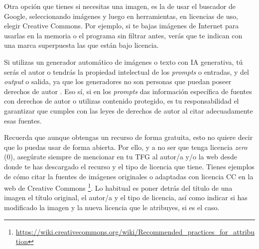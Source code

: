 
Otra opción que tienes si necesitas una imagen, es la de usar el buscador de Google, seleccionando imágenes y luego en herramientas, en licencias de uso, elegir Creative Commons. Por ejemplo, si te bajas imágenes de Internet para usarlas en la memoria o el programa sin filtrar antes, verás que te indican con una marca superpuesta las que están bajo licencia. 


Si utilizas un generador automático de imágenes o texto con IA generativa, tú serás el autor o tendrás la propiedad intelectual de los \textit{prompts} o entradas, y del \textit{output} o salida, ya que los generadores no son personas que puedan poseer derechos de autor \cite{derechosautorIA}. Eso sí, si en los \textit{prompts} das información específica de fuentes con derechos de autor o utilizas contenido protegido, es tu responsabilidad el garantizar que cumples con las leyes de derechos de autor al citar adecuadamente esas fuentes.

Recuerda que aunque obtengas un recurso de forma gratuita, esto no quiere decir que lo puedas usar de forma abierta. Por ello, y a no ser que tenga licencia \textit{zero} (0), asegúrate siempre de mencionar en tu TFG al autor/a y/o la web desde donde te has descargado el recurso y el tipo de licencia que tiene. Tienes ejemplos de cómo citar la fuentes de imágenes originales o adaptadas con licencia CC en la web de Creative Commons \footnote{\url{https://wiki.creativecommons.org/wiki/Recommended_practices_for_attribution}}. Lo habitual es poner detrás del título de una imagen el título original, el autor/a y el tipo de licencia, así como indicar si has modificado la imagen y la nueva licencia que le atribuyes, si es el caso.

